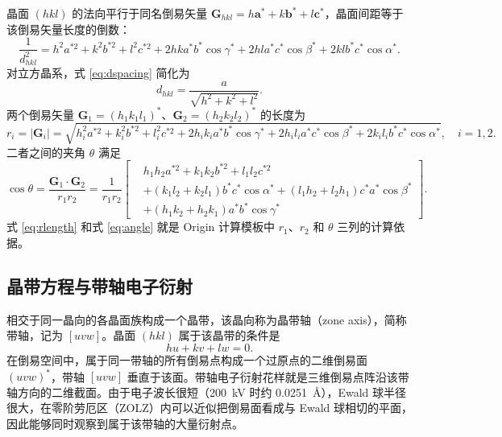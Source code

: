 晶面 $(hkl)$ 的法向平行于同名倒易矢量 $\bm{G}_{hkl}=h\bm{a}^*+k\bm{b}^*+l\bm{c}^*$，晶面间距等于该倒易矢量长度的倒数：
\begin{equation}
\frac{1}{d_{hkl}^2}=h^2a^{*2}+k^2b^{*2}+l^2c^{*2}
+2hka^*b^*\cos\gamma^*+2hla^*c^*\cos\beta^*+2klb^*c^*\cos\alpha^*.
\label{eq:dspacing}
\end{equation}
对立方晶系，式 \eqref{eq:dspacing} 简化为
\begin{equation}
d_{hkl}=\frac{a}{\sqrt{h^2+k^2+l^2}}.
\label{eq:dspacing-cubic}
\end{equation}
两个倒易矢量 $\bm{G}_1=(h_1k_1l_1)^*$、$\bm{G}_2=(h_2k_2l_2)^*$ 的长度为
\begin{equation}
r_i=\left|\bm{G}_i\right|=\sqrt{h_i^2a^{*2}+k_i^2b^{*2}+l_i^2c^{*2}
+2h_ik_ia^*b^*\cos\gamma^*+2h_il_ia^*c^*\cos\beta^*+2k_il_ib^*c^*\cos\alpha^*},
\quad i=1,2.
\label{eq:rlength}
\end{equation}
二者之间的夹角 $\theta$ 满足
\begin{equation}
\cos\theta=\frac{\bm{G}_1\cdot\bm{G}_2}{r_1r_2}
=\frac{1}{r_1r_2}\left[
\begin{aligned}
&h_1h_2a^{*2}+k_1k_2b^{*2}+l_1l_2c^{*2}\\
&+(k_1l_2+k_2l_1)b^*c^*\cos\alpha^*
 +(l_1h_2+l_2h_1)c^*a^*\cos\beta^*\\
&+(h_1k_2+h_2k_1)a^*b^*\cos\gamma^*
\end{aligned}
\right].
\label{eq:angle}
\end{equation}
式 \eqref{eq:rlength} 和式 \eqref{eq:angle} 就是 Origin 计算模板中 $r_1$、$r_2$ 和 $\theta$ 三列的计算依据。

\subsection{晶带方程与带轴电子衍射}

相交于同一晶向的各晶面族构成一个晶带，该晶向称为晶带轴（zone axis），简称带轴，记为 $[uvw]$。晶面 $(hkl)$ 属于该晶带的条件是
\begin{equation}
hu+kv+lw=0.
\label{eq:zone-law}
\end{equation}
在倒易空间中，属于同一带轴的所有倒易点构成一个过原点的二维倒易面 $(uvw)^*$，带轴 $[uvw]$ 垂直于该面。带轴电子衍射花样就是三维倒易点阵沿该带轴方向的二维截面。由于电子波长很短（200~kV 时约 0.0251~\AA），Ewald 球半径很大，在零阶劳厄区（ZOLZ）内可以近似把倒易面看成与 Ewald 球相切的平面，因此能够同时观察到属于该带轴的大量衍射点。

